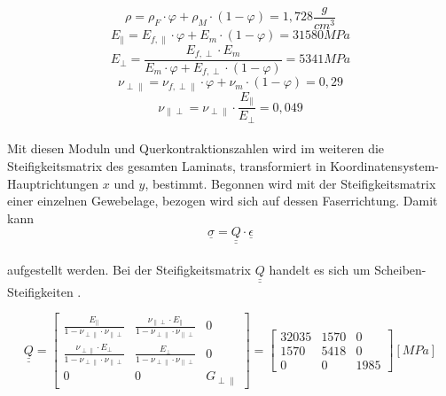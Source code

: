 \begin{equation}
	\rho=\rho_{F}\cdot\varphi +\rho_{M}\cdot (1-\varphi)=1,728\frac{g}{cm^{3}}
\end{equation}
\begin{equation}
	E_{\parallel}=E_{f,\parallel}\cdot \varphi+E_{m}\cdot (1-\varphi)=31580 MPa
\end{equation}
\begin{equation}
	E_{\perp}=\frac{E_{f,\perp}\cdot E_{m}}{E_{m}\cdot \varphi+E_{f,\perp}\cdot (1-\varphi)}=5341MPa
\end{equation}
\begin{equation}
	\nu_{\perp\parallel}=\nu_{f,\perp\parallel}\cdot\varphi+\nu_{m}\cdot(1-\varphi)=0,29
\end{equation}
\begin{equation}
	\nu_{\parallel\perp}=\nu_{\perp\parallel}\cdot\frac{E_{\parallel}}{E_{\perp}}=0,049
\end{equation}\\

\noindent Mit diesen Moduln und Querkontraktionszahlen wird im weiteren die Steifigkeitsmatrix des gesamten Laminats, transformiert in Koordinatensystem-Hauptrichtungen $x$ und $y$, bestimmt. Begonnen wird mit der Steifigkeitsmatrix einer einzelnen Gewebelage, bezogen wird sich auf dessen Faserrichtung. Damit kann  
\begin{equation}
	\underline{\sigma}=\underline{\underline{Q}} \cdot \underline{\epsilon}
\end{equation}\\aufgestellt werden. Bei der Steifigkeitsmatrix $\underline{\underline{Q}}$ handelt es sich um Scheiben-Steifigkeiten \cite{item3}.

\begin{equation}
\underline{\underline{Q}}=
\begin{bmatrix}
	\frac{E_{\|}}{1-\nu_{\perp \|}\cdot \nu_{\| \perp}}&	\frac{\nu_{\| \perp}\cdot E_{\|}}{1-\nu_{\perp \|}\cdot \nu_{\| \perp}}&0\\
	
	\frac{\nu_{\perp \|}\cdot E_{\perp}}{1-\nu_{\perp \|}\cdot \nu_{\| \perp}}&\frac{E_{\perp}}{1-\nu_{\perp \|}\cdot \nu_{\| \perp}}&0\\
	
	0&0&G_{\perp\parallel}
\end{bmatrix} =
\begin{bmatrix}
	32035 & 1570 & 0\\
	1570 & 5418 & 0\\
	0 & 0 & 1985
\end{bmatrix} [MPa]
\end{equation}\\

